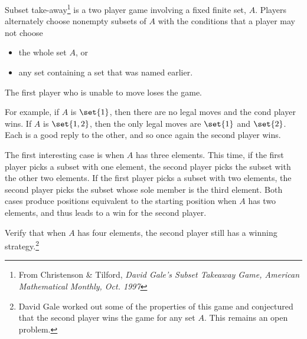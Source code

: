 \documentclass[handout]{mcs}
\begin{document}
\begin{problem}
Subset take-away\footnote{From Christenson \& Tilford, \emph{David Gale's
Subset Takeaway Game, American Mathematical Monthly, Oct. 1997}} is a two
player game involving a fixed finite set, $A$.  Players alternately choose
nonempty subsets of $A$ with the conditions that a player may not choose
\begin{itemize}
\item the whole set $A$, or
\item any set containing a set that was named earlier.
\end{itemize}
The first player who is unable to move loses the game.

For example, if $A$ is $\set{1}$, then there are no legal moves and the
cond player wins.  If $A$ is $\set{1,2}$, then the only legal moves are
$\set{1}$ and $\set{2}$.  Each is a good reply to the other, and so once
again the second player wins.

The first interesting case is when $A$ has three elements.  This time, if
the first player picks a subset with one element, the second player picks
the subset with the other two elements.  If the first player picks a
subset with two elements, the second player picks the subset whose sole
member is the third element.  \iffalse In short, in response to any first
move, the second player may choose the complementary set.\fi Both cases
produce positions equivalent to the starting position when $A$ has two
elements, and thus leads to a win for the second player.

Verify that when $A$ has four elements, the second player still has a
winning strategy.\footnote{David Gale worked out some of the properties of
this game and conjectured that the second player wins the game for
any set $A$.  This remains an open problem.}


\end{problem}
\end{document}
